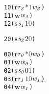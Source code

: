 \newsavebox{\boxTOne}
\begin{lrbox}{\boxTOne}
\begin{minipage}[t]{0.65\linewidth}
\large
\begin{alltt}
10 (\(\mathbf{r}\) \(\mathit{r\sb{2}}\) \(\mathit{\ast 1}\) \(\mathit{w\sb{2}}\))
11 (\(\mathbf{w}\) \(\mathit{w\sb{2}}\))
12 (\(\mathbf{s}\) \(\mathit{s\sb{1}}\) \(\mathit{1 0}\))
\end{alltt}
\end{minipage}
\end{lrbox}

\newsavebox{\boxTTwo}
\begin{lrbox}{\boxTTwo}
\begin{minipage}[t]{0.65\linewidth}
\large
\begin{alltt}
20 (\(\mathbf{s}\) \(\mathit{s\sb{2}}\) \(\mathit{2 0}\))
\end{alltt}
\end{minipage}
\end{lrbox}


\newcommand\examplefigone{
\begin{figure*}[tb]
\begin{center}
\setlength{\tabcolsep}{2pt}
\begin{tabular}[t]{c|c|c}
$\mathit{p_0}$ & $\mathit{p_1}$ & $\mathit{p_2}$ \\
\hline
\scalebox{0.8}{\usebox{\boxTZero}}&
\scalebox{0.8}{\usebox{\boxTOne}} &
\scalebox{0.8}{\usebox{\boxTTwo}}\\
\end{tabular}
\end{center}
\caption{A Deadlock Caused by Orphaned Receive}
\label{fig:deadlock1}
\end{figure*}
}



\newsavebox{\boxnozero}
\begin{lrbox}{\boxnozero}
\begin{minipage}[t]{0.65\linewidth}
\large
\begin{alltt}	
00 (\(\mathbf{r}\) \(\mathit{r\sb{0}}\) \(\mathit{\ast 0}\) \(\mathit{w\sb{0}}\))
01 (\(\mathbf{w}\) \(\mathit{w\sb{0}}\))
02 (\(\mathbf{s}\) \(\mathit{s\sb{0}}\) \(\mathit{0 1}\)) 
03 \underline{(\(\mathbf{r}\) \(\mathit{r\sb{1}}\) \(\mathit{1 0}\) \(\mathit{w\sb{1}}\))}
04 (\(\mathbf{w}\) \(\mathit{w\sb{1}}\)) 
\end{alltt}
\end{minipage}
\end{lrbox}

